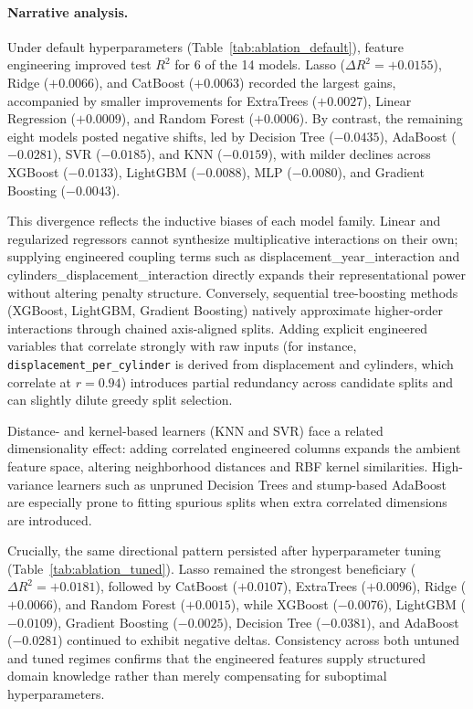 \paragraph{Narrative analysis.}
Under default hyperparameters (Table~\ref{tab:ablation_default})\cite{atique2026explainable}, feature engineering improved test \(R^2\) for 6 of the 14 models. Lasso (\(\Delta R^2 = +0.0155\)), Ridge (\(+0.0066\)), and CatBoost (\(+0.0063\)) recorded the largest gains, accompanied by smaller improvements for ExtraTrees (\(+0.0027\)), Linear Regression (\(+0.0009\)), and Random Forest (\(+0.0006\)). By contrast, the remaining eight models posted negative shifts, led by Decision Tree (\(-0.0435\)), AdaBoost (\(-0.0281\)), SVR (\(-0.0185\)), and KNN (\(-0.0159\)), with milder declines across XGBoost (\(-0.0133\)), LightGBM (\(-0.0088\)), MLP (\(-0.0080\)), and Gradient Boosting (\(-0.0043\)).

This divergence reflects the inductive biases of each model family. Linear and regularized regressors cannot synthesize multiplicative interactions on their own; supplying engineered coupling terms such as displacement\_year\_interaction and cylinders\_displacement\_interaction directly expands their representational power without altering penalty structure. Conversely, sequential tree-boosting methods (XGBoost, LightGBM, Gradient Boosting) natively approximate higher-order interactions through chained axis-aligned splits. Adding explicit engineered variables that correlate strongly with raw inputs (for instance, \texttt{displacement\_per\_cylinder} is derived from displacement and cylinders, which correlate at \(r = 0.94\)) introduces partial redundancy across candidate splits and can slightly dilute greedy split selection.

Distance- and kernel-based learners (KNN and SVR) face a related dimensionality effect: adding correlated engineered columns expands the ambient feature space, altering neighborhood distances and RBF kernel similarities. High-variance learners such as unpruned Decision Trees and stump-based AdaBoost are especially prone to fitting spurious splits when extra correlated dimensions are introduced.

Crucially, the same directional pattern persisted after hyperparameter tuning (Table~\ref{tab:ablation_tuned})\cite{atique2026explainable}. Lasso remained the strongest beneficiary (\(\Delta R^2 = +0.0181\)), followed by CatBoost (\(+0.0107\)), ExtraTrees (\(+0.0096\)), Ridge (\(+0.0066\)), and Random Forest (\(+0.0015\)), while XGBoost (\(-0.0076\)), LightGBM (\(-0.0109\)), Gradient Boosting (\(-0.0025\)), Decision Tree (\(-0.0381\)), and AdaBoost (\(-0.0281\)) continued to exhibit negative deltas. Consistency across both untuned and tuned regimes confirms that the engineered features supply structured domain knowledge rather than merely compensating for suboptimal hyperparameters.

